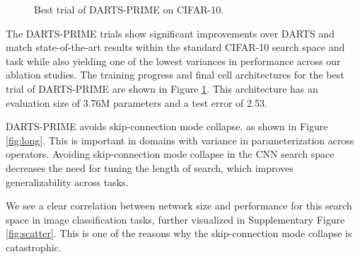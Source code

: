 \documentclass[letterpaper]{article} \usepackage{aaai22}  \usepackage{times}  \usepackage{helvet}  \usepackage{courier}  \usepackage[hyphens]{url}  \usepackage{graphicx} \urlstyle{rm} \def\UrlFont{\rm}  \usepackage{natbib}  \usepackage{caption} \DeclareCaptionStyle{ruled}{labelfont=normalfont,labelsep=colon,strut=off} \frenchspacing  \setlength{\pdfpagewidth}{8.5in}  \setlength{\pdfpageheight}{11in}  \usepackage{algorithm}
\begin{document}
\begin{figure}[hbtp!]
\begin{minipage}{.9\linewidth}
\centering
{}
\end{minipage}\par
\begin{minipage}{.9\linewidth}
\centering
{}
\end{minipage}\par
\begin{minipage}{.345\linewidth}
\centering
{}
\end{minipage}
\begin{minipage}{.645\linewidth}
\centering
{}
\end{minipage}
\caption{Best trial of DARTS-PRIME on CIFAR-10.}
\label{fig:pf}
\end{figure}

The DARTS-PRIME trials show significant improvements over DARTS and match state-of-the-art results within the standard CIFAR-10 search space and task while also yielding one of the lowest variances in performance across our ablation studies. The training progress and final cell architectures for the best trial of DARTS-PRIME are shown in Figure \ref{fig:pf}. This architecture has an evaluation size of 3.76M parameters and a test error of 2.53.

DARTS-PRIME avoids skip-connection mode collapse, as shown in Figure \ref{fig:long}. This is important in domains with variance in parameterization across operators. Avoiding skip-connection mode collapse in the CNN search space decreases the need for tuning the length of search, which improves generalizability across tasks.

We see a clear correlation between network size and performance for this search space in image classification tasks, further visualized in Supplementary Figure \ref{fig:scatter}. This is one of the reasons why the skip-connection mode collapse is catastrophic.
\end{document}
